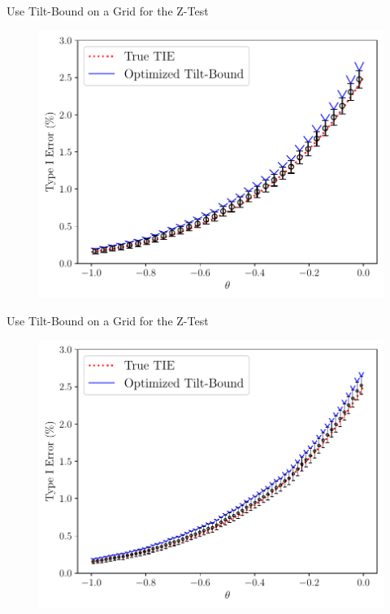 \begin{frame}{Use Tilt-Bound on a Grid for the Z-Test}
\begin{figure}
    \centering
    \includegraphics[width=0.95\linewidth]{figs/validation_32.pdf}
\end{figure} 
\end{frame}

\begin{frame}{Use Tilt-Bound on a Grid for the Z-Test}
\begin{figure}
    \centering
    \includegraphics[width=0.95\linewidth]{figs/validation_64.pdf}
\end{figure} 
\end{frame}